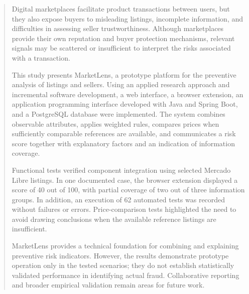 
\begin{abstract}

Digital marketplaces facilitate product transactions between users, but they also expose buyers to misleading listings, incomplete information, and difficulties in assessing seller trustworthiness. Although marketplaces provide their own reputation and buyer protection mechanisms, relevant signals may be scattered or insufficient to interpret the risks associated with a transaction.

This study presents MarketLens, a prototype platform for the preventive analysis of listings and sellers. Using an applied research approach and incremental software development, a web interface, a browser extension, an application programming interface developed with Java and Spring Boot, and a PostgreSQL database were implemented. The system combines observable attributes, applies weighted rules, compares prices when sufficiently comparable references are available, and communicates a risk score together with explanatory factors and an indication of information coverage.

Functional tests verified component integration using selected Mercado Libre listings. In one documented case, the browser extension displayed a score of 40 out of 100, with partial coverage of two out of three information groups. In addition, an execution of 62 automated tests was recorded without failures or errors. Price-comparison tests highlighted the need to avoid drawing conclusions when the available reference listings are insufficient.

MarketLens provides a technical foundation for combining and explaining preventive risk indicators. However, the results demonstrate prototype operation only in the tested scenarios; they do not establish statistically validated performance in identifying actual fraud. Collaborative reporting and broader empirical validation remain areas for future work.

\end{abstract}
